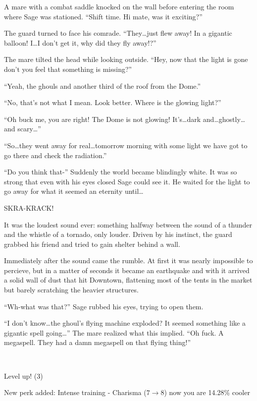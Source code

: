 A mare with a combat saddle knocked on the wall before entering the room where Sage was stationed. ``Shift time. Hi mate, was it exciting?''

The guard turned to face his comrade. ``They\dots just flew away! In a gigantic balloon! I\dots I don't get it, why did they fly away!?''

The mare tilted the head while looking outside. ``Hey, now that the light is gone don't you feel that something is missing?''

``Yeah, the ghouls and another third of the roof from the Dome.''

``No, that's not what I mean. Look better. Where is the glowing light?''

``Oh buck me, you are right! The Dome is not glowing! It's\dots dark and\dots ghostly\dots and scary\dots''

``So\dots they went away for real\dots tomorrow morning with some light we have got to go there and check the radiation.''

``Do you think that-'' Suddenly the world became blindingly white. It was so strong that even with his eyes closed Sage could see it. He waited for the light to go away for what it seemed an eternity until\dots

SKRA-KRACK!

It was the loudest sound ever: something halfway between the sound of a thunder and the whistle of a tornado, only louder. Driven by his instinct, the guard grabbed his friend and tried to gain shelter behind a wall.

Immediately after the sound came the rumble. At first it was nearly impossible to percieve, but in a matter of seconds it became an earthquake and with it arrived a solid wall of dust that hit Downtown, flattening most of the tents in the market but barely scratching the heavier structures.

``Wh-what was that?'' Sage rubbed his eyes, trying to open them.

``I don't know\dots the ghoul's flying machine exploded? It seemed something like a gigantic spell going\dots'' The mare realized what this implied. ``Oh fuck. A megaspell. They had a damn megaspell on that flying thing!''

~\vfill

\begin{engnote}
    Level up! (3)
    
    New perk added: Intense training - Charisma ($7 \to 8$) now you are 14.28\% cooler
\end{engnote}




